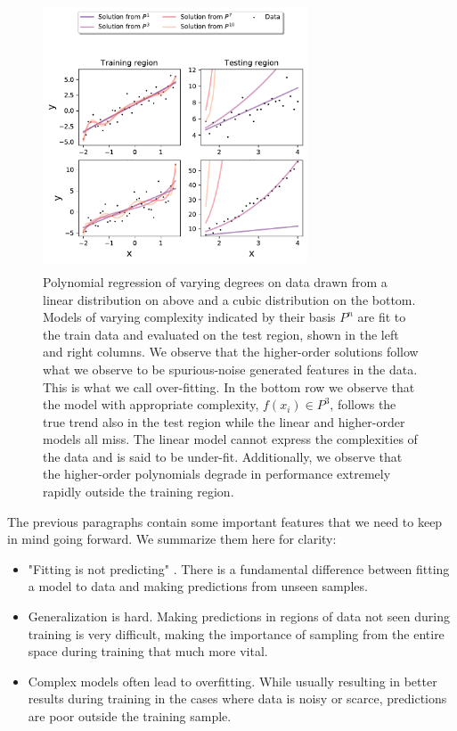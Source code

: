 \begin{figure}
\centering
\includegraphics[width=0.7\textwidth, height=8cm]{../figures/y_distr.pdf}
\caption[Illustrating over-fitting with polynomial regression]{Polynomial regression of varying degrees on data drawn from a linear distribution on above and a cubic distribution on the bottom. Models of varying complexity indicated by their basis $P^n$ are fit to the train data and evaluated on the test region, shown in the left and right columns. We observe that the higher-order solutions follow what we observe to be spurious-noise generated features in the data. This is what we call over-fitting. In the bottom row we observe that the model with appropriate complexity, $f(x_i) \in P^3$, follows the true trend also in the test region while the linear and higher-order models all miss. The linear model cannot express the complexities of the data and is said to be under-fit. Additionally, we observe that the higher-order polynomials degrade in performance extremely rapidly outside the training region.}\label{fig:overfit}
\end{figure}

The previous paragraphs contain some important features that we need to keep in mind going forward. We summarize them here for clarity: 
\begin{itemize}
\item "Fitting is not predicting" \cite{Mehta2019}. There is a fundamental difference between fitting a model to data and making predictions from unseen samples. \\
\item Generalization is hard. Making predictions in regions of data not seen during training is very difficult, making the importance of sampling from the entire space during training that much more vital. \\
\item Complex models often lead to overfitting. While usually resulting in better results during training in the cases where data is noisy or scarce, predictions are poor outside the training sample. 
\end{itemize}



